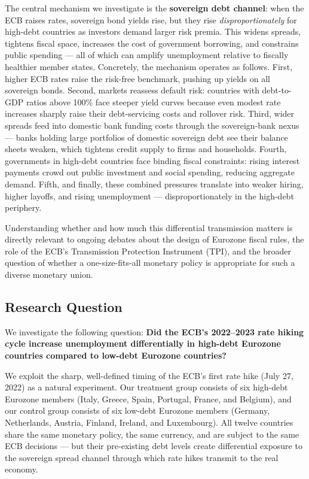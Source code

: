 \documentclass[12pt,a4paper]{article}
\begin{document}
The central mechanism we investigate is the \textbf{sovereign debt channel}: when the ECB raises rates, sovereign bond yields rise, but they rise \textit{disproportionately} for high-debt countries as investors demand larger risk premia. This widens spreads, tightens fiscal space, increases the cost of government borrowing, and constrains public spending --- all of which can amplify unemployment relative to fiscally healthier member states. Concretely, the mechanism operates as follows. First, higher ECB rates raise the risk-free benchmark, pushing up yields on all sovereign bonds. Second, markets reassess default risk: countries with debt-to-GDP ratios above 100\% face steeper yield curves because even modest rate increases sharply raise their debt-servicing costs and rollover risk. Third, wider spreads feed into domestic bank funding costs through the sovereign-bank nexus --- banks holding large portfolios of domestic sovereign debt see their balance sheets weaken, which tightens credit supply to firms and households. Fourth, governments in high-debt countries face binding fiscal constraints: rising interest payments crowd out public investment and social spending, reducing aggregate demand. Fifth, and finally, these combined pressures translate into weaker hiring, higher layoffs, and rising unemployment --- disproportionately in the high-debt periphery.

Understanding whether and how much this differential transmission matters is directly relevant to ongoing debates about the design of Eurozone fiscal rules, the role of the ECB's Transmission Protection Instrument (TPI), and the broader question of whether a one-size-fits-all monetary policy is appropriate for such a diverse monetary union.

\subsection{Research Question}

We investigate the following question: \textbf{Did the ECB's 2022--2023 rate hiking cycle increase unemployment differentially in high-debt Eurozone countries compared to low-debt Eurozone countries?}

We exploit the sharp, well-defined timing of the ECB's first rate hike (July 27, 2022) as a natural experiment. Our treatment group consists of six high-debt Eurozone members (Italy, Greece, Spain, Portugal, France, and Belgium), and our control group consists of six low-debt Eurozone members (Germany, Netherlands, Austria, Finland, Ireland, and Luxembourg). All twelve countries share the same monetary policy, the same currency, and are subject to the same ECB decisions --- but their pre-existing debt levels create differential exposure to the sovereign spread channel through which rate hikes transmit to the real economy.
\end{document}
